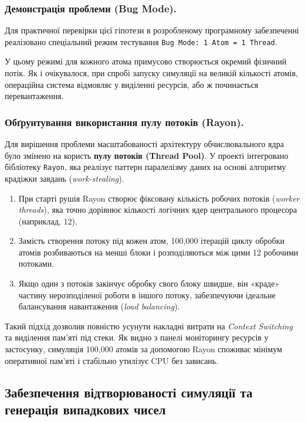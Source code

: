 \documentclass[14pt, a4paper]{extreport}
\begin{document}
	\subsubsection{Демонстрація проблеми (Bug Mode).}
	
	Для практичної перевірки цієї гіпотези в розробленому програмному забезпеченні реалізовано спеціальний режим тестування \texttt{Bug Mode: 1 Atom = 1 Thread}. 
	
	У цьому режимі для кожного атома примусово створюється окремий фізичний потік. Як і очікувалося, при спробі запуску симуляції на великій кількості атомів, операційна система відмовляє у виділенні ресурсів, або ж починається перевантаження.
		
	\subsubsection{Обґрунтування використання пулу потоків (Rayon).}
	
	Для вирішення проблеми масштабованості архітектуру обчислювального ядра було змінено на користь \textbf{пулу потоків (Thread Pool)}. У проекті інтегровано бібліотеку \texttt{Rayon}, яка реалізує паттерн паралелізму даних на основі алгоритму крадіжки завдань (\textit{work-stealing}).
	
	\begin{enumerate}
		\item При старті рушія Rayon створює фіксовану кількість робочих потоків (\textit{worker threads}), яка точно дорівнює кількості логічних ядер центрального процесора (наприклад, 12).
		\item Замість створення потоку під кожен атом, 100,000 ітерацій циклу обробки атомів розбиваються на менші блоки і розподіляються між цими 12 робочими потоками.
		\item Якщо один з потоків закінчує обробку свого блоку швидше, він «краде» частину нерозподіленої роботи в іншого потоку, забезпечуючи ідеальне балансування навантаження (\textit{load balancing}).
	\end{enumerate}
	
	Такий підхід дозволив повністю усунути накладні витрати на \textit{Context Switching} та виділення пам'яті під стеки. Як видно з панелі моніторингу ресурсів у застосунку, симуляція 100,000 атомів за допомогою Rayon споживає мінімум оперативної пам'яті і стабільно утилізує CPU без зависань.
	
	
	\subsection{Забезпечення відтворюваності симуляції та генерація випадкових чисел}
	
\end{document}
